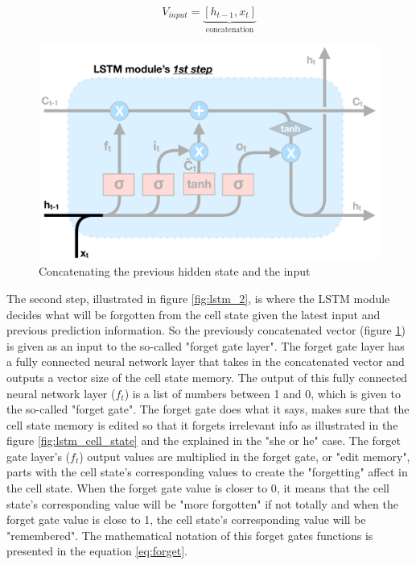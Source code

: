 \begin{equation} \label{eq:concat}
    V_{input} = \underbrace{ [h_{t-1}, x_t] }_\text{concatenation}
\end{equation}

\begin{figure}[h]
    \centering
    \includegraphics[width=12cm,height=\textheight,keepaspectratio]{lstm_1}
    \caption{Concatenating the previous hidden state and the input}
    \label{fig:lstm_1}
\end{figure}

The second step, illustrated in figure \ref{fig:lstm_2}, is where the LSTM module decides what will be forgotten from the cell state given the latest input and previous prediction information. So the previously concatenated vector (figure \ref{fig:lstm_1}) is given as an input to the so-called "forget gate layer". The forget gate layer has a fully connected neural network layer that takes in the concatenated vector and outputs a vector size of the cell state memory. The output of this fully connected neural network layer ($f_t$) is a list of numbers between 1 and 0, which is given to the so-called "forget gate". The forget gate does what it says, makes sure that the cell state memory is edited so that it forgets irrelevant info as illustrated in the figure \ref{fig:lstm_cell_state} and the explained in the "she or he" case. The forget gate layer's ($f_t$) output values are multiplied in the forget gate, or "edit memory", parts with the cell state's corresponding values to create the "forgetting" affect in the cell state. When the forget gate value is closer to 0, it means that the cell state's corresponding value will be "more forgotten" if not totally and when the forget gate value is close to 1, the cell state's corresponding value will be "remembered". The mathematical notation of this forget gates functions is presented in the equation \ref{eq:forget}.

